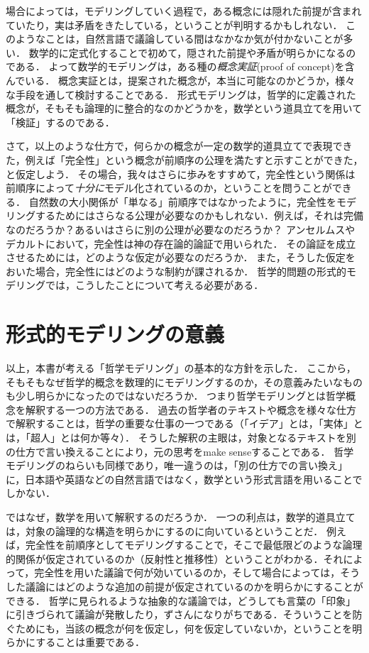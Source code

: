\documentclass[11pt,a4paper]{jsarticle}
\begin{document}
場合によっては，モデリングしていく過程で，ある概念には隠れた前提が含まれていたり，実は矛盾をきたしている，ということが判明するかもしれない．
このようなことは，自然言語で議論している間はなかなか気が付かないことが多い．
数学的に定式化することで初めて，隠された前提や矛盾が明らかになるのである．
よって数学的モデリングは，ある種の\emph{概念実証}(proof of concept)を含んでいる．
概念実証とは，提案された概念が，本当に可能なのかどうか，様々な手段を通して検討することである．
形式モデリングは，哲学的に定義された概念が，そもそも論理的に整合的なのかどうかを，数学という道具立てを用いて「検証」するのである．

さて，以上のような仕方で，何らかの概念が一定の数学的道具立てで表現できた，例えば「完全性」という概念が前順序の公理を満たすと示すことができた，と仮定しよう．
その場合，我々はさらに歩みをすすめて，完全性という関係は前順序によって\emph{十分に}モデル化されているのか，ということを問うことができる．
自然数の大小関係が「単なる」前順序ではなかったように，完全性をモデリングするためにはさらなる公理が必要なのかもしれない．例えば，それは完備なのだろうか？あるいはさらに別の公理が必要なのだろうか？
アンセルムスやデカルトにおいて，完全性は神の存在論的論証で用いられた．
その論証を成立させるためには，どのような仮定が必要なのだろうか．
また，そうした仮定をおいた場合，完全性にはどのような制約が課されるか．
哲学的問題の形式的モデリングでは，こうしたことについて考える必要がある．


\section{形式的モデリングの意義}

以上，本書が考える「哲学モデリング」の基本的な方針を示した．
ここから，そもそもなぜ哲学的概念を数理的にモデリングするのか，その意義みたいなものも少し明らかになったのではないだろうか．
つまり哲学モデリングとは哲学概念を解釈する一つの方法である．
過去の哲学者のテキストや概念を様々な仕方で解釈することは，哲学の重要な仕事の一つである（「イデア」とは，「実体」とは，「超人」とは何か等々）．
そうした解釈の主眼は，対象となるテキストを別の仕方で言い換えることにより，元の思考をmake senseすることである．
哲学モデリングのねらいも同様であり，唯一違うのは，「別の仕方での言い換え」に，日本語や英語などの自然言語ではなく，数学という形式言語を用いることでしかない．

ではなぜ，数学を用いて解釈するのだろうか．
一つの利点は，数学的道具立ては，対象の論理的な構造を明らかにするのに向いているということだ．
例えば，完全性を前順序としてモデリングすることで，そこで最低限どのような論理的関係が仮定されているのか（反射性と推移性）ということがわかる．それによって，完全性を用いた議論で何が効いているのか，そして場合によっては，そうした議論にはどのような追加の前提が仮定されているのかを明らかにすることができる．
哲学に見られるような抽象的な議論では，どうしても言葉の「印象」に引きづられて議論が発散したり，ずさんになりがちである．そういうことを防ぐためにも，当該の概念が何を仮定し，何を仮定していないか，ということを明らかにすることは重要である．
\end{document}
